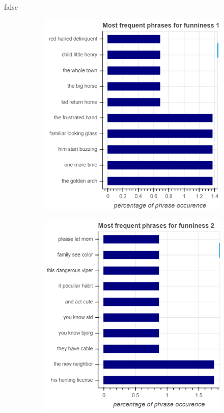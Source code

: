 \documentclass[draft,final,oneside]{vutinfth} %
\begin{document}
\if false
\begin{figure}
\centering

\begin{subfigure}[b]{0.45\textwidth}
\centering
\includegraphics[width=1.0\textwidth]{graphics/phrases/funniness_1}
\end{subfigure}\quad
\begin{subfigure}[b]{0.45\textwidth}
\centering
\includegraphics[width=1.0\textwidth]{graphics/phrases/funniness_2}
\end{subfigure}


\end{figure}
\end{document}
